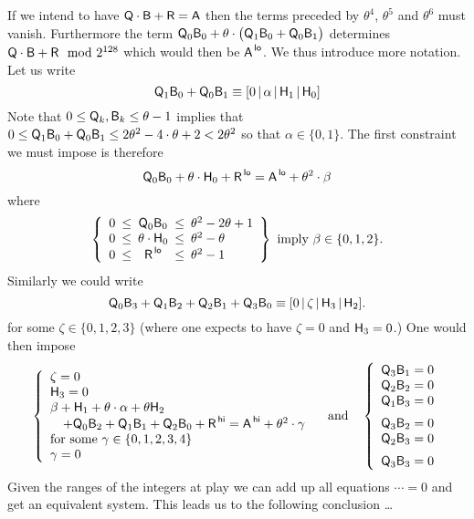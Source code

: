 If we intend to have $\textsf{Q} \cdot \textsf{B} + \textsf{R} = \textsf{A}$ then the terms preceded by $\theta^{4}$, $\theta^{5}$ and $\theta^{6}$ must vanish. Furthermore the term
$\textsf{Q}_{0}\textsf{B}_{0}
+ \theta\cdot
\big(
\textsf{Q}_{1}\textsf{B}_{0}
+ \textsf{Q}_{0}\textsf{B}_{1}
\big)$ determines $\textsf{Q} \cdot \textsf{B} + \textsf{R} \mod 2^{128}$ which would then be $\textsf{A}^{\mathsf{\,lo}}$.
We thus introduce more notation. Let us write
\[
	\textsf{Q}_{1}\textsf{B}_{0}
	+
	\textsf{Q}_{0}\textsf{B}_{1}
	\equiv
	[0
	\,|\, \alpha
	\,|\, \textsf{H}_{1}
	\,|\, \textsf{H}_{0}
	]
\]
Note that $0 \leq \textsf{Q}_{k},\textsf{B}_{k} \leq \theta - 1$ implies that $0 \leq \textsf{Q}_{1}\textsf{B}_{0} + \textsf{Q}_{0}\textsf{B}_{1} \leq 2 \theta^2 - 4\cdot\theta + 2 < 2 \theta^2$ so that $\alpha\in\{0,1\}$. The first constraint we must impose is therefore
\[
	\textsf{Q}_{0}\textsf{B}_{0}
	+
	\theta \cdot \textsf{H}_{0}
	+
	\textsf{R}^{\mathsf{\,lo}}
	=
	\textsf{A}^{\mathsf{\,lo}} + \theta^2 \cdot \beta
\]
where
\[
	\left\{
	\begin{array}{ccccl}
		0 & \!\!\! \leq \!\!\! & \col{Q}_{0}\col{B}_{0} & \!\!\! \leq \!\!\! & \theta^2 - 2\theta + 1 \\
		0 & \!\!\! \leq \!\!\! & \theta \cdot \col{H}_{0} & \!\!\! \leq \!\!\! & \theta^2 - \theta \\
		0 & \!\!\! \leq \!\!\! & \col{R}\low & \!\!\! \leq \!\!\! & \theta^2 - 1 \\
	\end{array}
	\right\}
	\text{ imply }
	\beta\in\{0,1,2\}.
\]
Similarly we could write
\[
	\textsf{Q}_{0}\textsf{B}_{3}
	+
	\textsf{Q}_{1}\textsf{B}_{2}
	+
	\textsf{Q}_{2}\textsf{B}_{1}
	+
	\textsf{Q}_{3}\textsf{B}_{0}
	\equiv
	[0 \,|\,
	\zeta \,|\,
	\textsf{H}_{3} \,|\,
	\textsf{H}_{2} ].
\]
for some $\zeta\in\{0, 1, 2, 3\}$ (where one expects to have $\zeta = 0$ and $\textsf{H}_{3} = 0$.) One would then impose
\[
	\left\{\begin{array}{l}
	\zeta = 0 \\
	\col{H}_{3} = 0 \\
	\beta + \col{H}_{1} + \theta \cdot \alpha + \theta\col{H}_{2} \\
	\quad + 
	\col{Q}_{0}\col{B}_{2}
	+
	\col{Q}_{1}\col{B}_{1}
	+
	\col{Q}_{2}\col{B}_{0} + \col{R}\high = \col{A}\high
	+ \theta^2 \cdot \gamma \\
	\text{for some }\gamma\in\{0,1,2,3,4\} \\
	\gamma = 0 \\
	\end{array}
	\right.
	\quad\text{and}\quad
	\left\{
	\begin{array}{l}
	\col{Q}_{3}\col{B}_{1} = 0 \\
	\col{Q}_{2}\col{B}_{2} = 0 \\
	\col{Q}_{1}\col{B}_{3} = 0 \vspace{2mm} \\
	\col{Q}_{3}\col{B}_{2} = 0 \\
	\col{Q}_{2}\col{B}_{3} = 0 \vspace{2mm} \\
	\col{Q}_{3}\col{B}_{3} = 0 \\
	\end{array}
	\right.
\]
Given the ranges of the integers at play we can add up all equations $\cdots = 0$ and get an equivalent system. This leads us to the following conclusion \dots{} 

